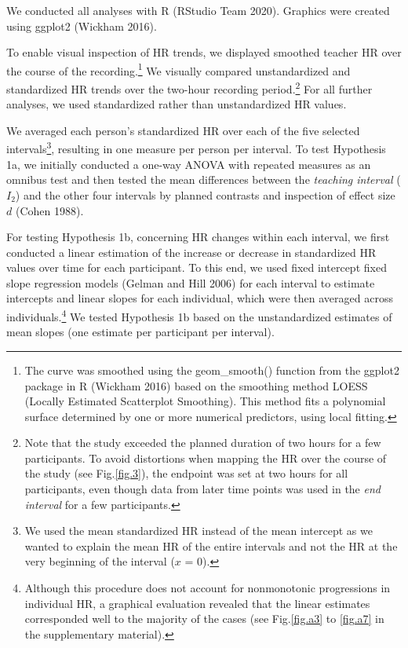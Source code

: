 \documentclass[preprint,
3p]{elsarticle} %
\begin{document}
We conducted all analyses with R (RStudio Team 2020). Graphics were
created using ggplot2 (Wickham 2016).

To enable visual inspection of HR trends, we displayed smoothed teacher
HR over the course of the recording.\footnote{The curve was smoothed
  using the geom\_smooth() function from the ggplot2 package in R
  (Wickham 2016) based on the smoothing method LOESS (Locally Estimated
  Scatterplot Smoothing). This method fits a polynomial surface
  determined by one or more numerical predictors, using local fitting.}
We visually compared unstandardized and standardized HR trends over the
two-hour recording period.\footnote{Note that the study exceeded the
  planned duration of two hours for a few participants. To avoid
  distortions when mapping the HR over the course of the study (see
  Fig.\ref{fig.3}), the endpoint was set at two hours for all
  participants, even though data from later time points was used in the
  \emph{end interval} for a few participants.} For all further analyses,
we used standardized rather than unstandardized HR values.

We averaged each person's standardized HR over each of the five selected
intervals\footnote{We used the mean standardized HR instead of the mean
  intercept as we wanted to explain the mean HR of the entire intervals
  and not the HR at the very beginning of the interval (\(x\) = 0).},
resulting in one measure per person per interval. To test Hypothesis 1a,
we initially conducted a one-way ANOVA with repeated measures as an
omnibus test and then tested the mean differences between the
\emph{teaching interval} (\(I_2\)) and the other four intervals by
planned contrasts and inspection of effect size \(d\) (Cohen 1988).

For testing Hypothesis 1b, concerning HR changes within each interval,
we first conducted a linear estimation of the increase or decrease in
standardized HR values over time for each participant. To this end, we
used fixed intercept fixed slope regression models (Gelman and Hill
2006) for each interval to estimate intercepts and linear slopes for
each individual, which were then averaged across individuals.\footnote{Although
  this procedure does not account for nonmonotonic progressions in
  individual HR, a graphical evaluation revealed that the linear
  estimates corresponded well to the majority of the cases (see
  Fig.\ref{fig.a3} to \ref{fig.a7} in the supplementary material).} We
tested Hypothesis 1b based on the unstandardized estimates of mean
slopes (one estimate per participant per interval).
\end{document}
